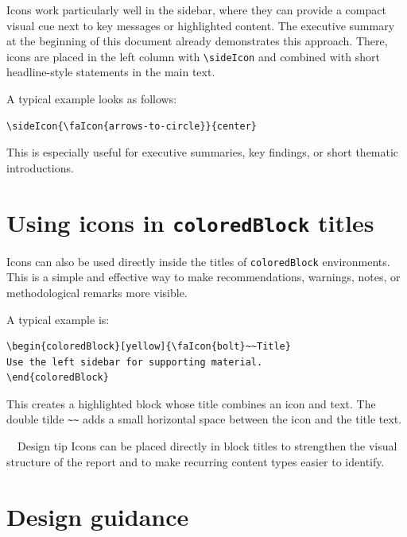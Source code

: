 \documentclass[11pt,a4paper]{report}
\begin{document}
Icons work particularly well in the sidebar, where they can provide a compact visual cue next to key messages or highlighted content. The executive summary at the beginning of this document already demonstrates this approach. There, icons are placed in the left column with \texttt{\textbackslash sideIcon} and combined with short headline-style statements in the main text.

A typical example looks as follows:

\begin{coloredBlock}[grey]{}
\begin{verbatim}
\sideIcon{\faIcon{arrows-to-circle}}{center}
\end{verbatim}
\end{coloredBlock}

This is especially useful for executive summaries, key findings, or short thematic introductions.

\section{Using icons in \texttt{coloredBlock} titles}

Icons can also be used directly inside the titles of \texttt{coloredBlock} environments. This is a simple and effective way to make recommendations, warnings, notes, or methodological remarks more visible.

A typical example is:

\begin{coloredBlock}[grey]{}
\begin{verbatim}
\begin{coloredBlock}[yellow]{\faIcon{bolt}~~Title}
Use the left sidebar for supporting material.
\end{coloredBlock}
\end{verbatim}
\end{coloredBlock}

This creates a highlighted block whose title combines an icon and text. The double tilde \texttt{\~{}\~{}} adds a small horizontal space between the icon and the title text.

\begin{coloredBlock}[turquoise]{~~Design tip}
Icons can be placed directly in block titles to strengthen the visual structure of the report and to make recurring content types easier to identify.
\end{coloredBlock}

\section{Design guidance}
\end{document}
